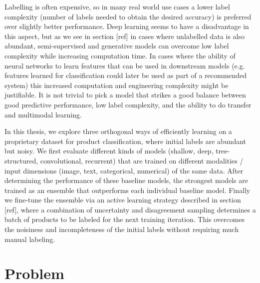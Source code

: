 Labelling is often expensive, so in many real world use cases a lower label complexity (number of labels needed to obtain the desired accuracy) is preferred over slightly better performance.
Deep learning seems to have a disadvantage in this aspect, but as we see in section [ref] in cases where unlabelled data is also abundant, semi-supervised and generative models can overcome low label complexity while increasing computation time.
In cases where the ability of neural networks to learn features that can be used in downstream models (e.g. features learned for classification could later be used as part of a recommended system) this increased computation and engineering complexity might be justifiable.
It is not trivial to pick a model that strikes a good balance between good predictive performance, low label complexity, and the ability to do transfer and multimodal learning.

In this thesis, we explore three orthogonal ways of efficiently learning on a proprietary dataset for product classification, where initial labels are abundant but noisy. We first evaluate different kinds of models (shallow, deep, tree-structured, convolutional, recurrent) that are trained on different modalities / input dimensions (image, text, categorical, numerical) of the same data. After determining the performance of these baseline models, the strongest models are trained as an ensemble that outperforms each individual baseline model. Finally we fine-tune the ensemble via an active learning strategy described in section [ref], where a combination of uncertainty and disagreement sampling determines a batch of products to be labeled for the next training iteration. This overcomes the noisiness and incompleteness of the initial labels without requiring much manual labeling.

\section{Problem}

